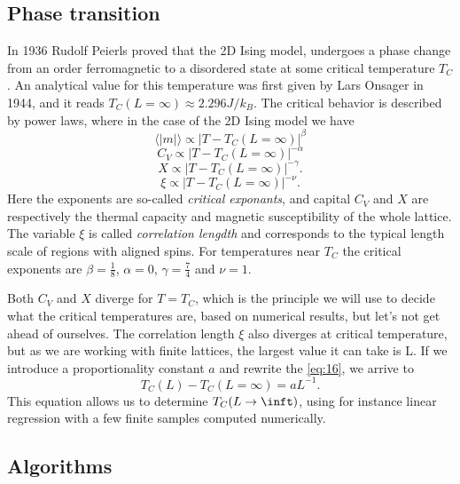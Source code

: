 \documentclass[english,notitlepage,reprint,nofootinbib]{revtex4-1}  %
\begin{document}
\subsection{Phase transition}

  In 1936 Rudolf Peierls proved that the 2D Ising model, undergoes a phase change from an order ferromagnetic to a disordered state at some critical temperature $T_C$. An analytical value for this temperature was first given by Lars Onsager in 1944, and it reads $T_C(L=\infty) \approx 2.296 J/k_B $. The critical behavior is described by power laws, where in the case of the 2D Ising model we have
\begin{equation}
    \langle |m| \rangle \propto |T - T_C(L=\infty)|^\beta
\end{equation}
\begin{equation}
    C_V \propto |T - T_C(L=\infty)|^{- \alpha}
\end{equation}
\begin{equation}
    X \propto |T - T_C(L=\infty)|^{- \gamma}.
\end{equation}
\begin{equation} \label{eq:16}
    \xi \propto |T - T_C(L=\infty)|^{- \nu}.
\end{equation}
Here the exponents are so-called \textit{critical exponants}, and capital $C_V$ and $X$ are respectively the thermal capacity and magnetic susceptibility of the whole lattice. The variable $\xi$ is called \textit{correlation lengdth} and corresponds to the typical length scale of regions with aligned spins. For temperatures near $T_C$ the critical exponents are $\beta = \frac{1}{8}$, $\alpha = 0$,  $\gamma = \frac{7}{4}$ and $\nu = 1$. 

Both $C_V$ and $X$ diverge for $T=T_C$, which is the principle we will use to decide what the critical temperatures are, based on numerical results, but let's not get ahead of ourselves. The correlation length $\xi$ also diverges at critical temperature, but as we are working with finite lattices, the largest value it can take is L. If we introduce a proportionality constant $a$ and rewrite the \ref{eq:16}, we arrive to
\begin{equation} \label{eq:17}
    T_C(L) - T_C(L=\infty) = aL^{-1}.
\end{equation}
This equation allows us to determine $T_C(L \rightarrow \inft)$, using for instance linear regression with a few finite samples computed numerically.



\subsection{Algorithms}
\end{document}
